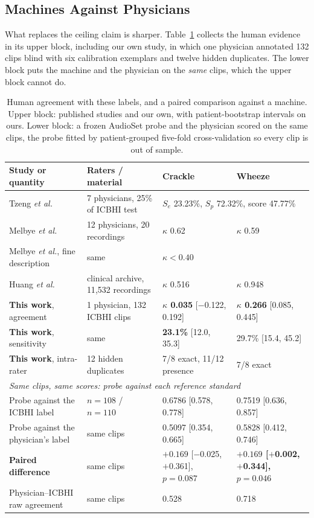\documentclass[journal,onecolumn]{IEEEtran}
\newcommand{\best}[1]{\textbf{#1}}
\begin{document}
\subsection{Machines Against Physicians}
\label{subsec:human}

What replaces the ceiling claim is sharper. Table~\ref{tab:human} collects the human evidence
in its upper block, including our own study, in which one physician annotated 132 clips blind
with six calibration exemplars and twelve hidden duplicates. The lower block puts the machine
and the physician on the \emph{same} clips, which the upper block cannot do.

\begin{table}[!t]
\centering
\caption{Human agreement with these labels, and a paired comparison against a machine. Upper
block: published studies and our own, with patient-bootstrap intervals on ours. Lower block: a
frozen AudioSet probe and the physician scored on the same clips, the probe fitted by
patient-grouped five-fold cross-validation so every clip is out of sample.}
\label{tab:human}
\footnotesize
\begin{tabular}{llll}
\toprule
Study or quantity & Raters / material & Crackle & Wheeze \\
\midrule
Tzeng \emph{et al.}~\cite{tzeng2025jmir} & 7 physicians, 25\% of ICBHI test & \multicolumn{2}{l}{$S_e$ 23.23\%, $S_p$ 72.32\%, score 47.77\%} \\
Melbye \emph{et al.}~\cite{melbye2016kappa} & 12 physicians, 20 recordings & $\kappa$ 0.62 & $\kappa$ 0.59 \\
Melbye \emph{et al.}, fine description & same & \multicolumn{2}{l}{$\kappa < 0.40$} \\
Huang \emph{et al.}~\cite{huang2024crackles} & clinical archive, 11{,}532 recordings & $\kappa$ 0.516 & $\kappa$ 0.948 \\
\addlinespace
\best{This work}, agreement & 1 physician, 132 ICBHI clips & \best{$\kappa$ 0.035} [$-$0.122, 0.192] & \best{$\kappa$ 0.266} [0.085, 0.445] \\
\best{This work}, sensitivity & same & \best{23.1\%} [12.0, 35.3] & 29.7\% [15.4, 45.2] \\
\best{This work}, intra-rater & 12 hidden duplicates & 7/8 exact, 11/12 presence & 7/8 exact \\
\midrule
\multicolumn{4}{l}{\emph{Same clips, same scores: probe against each reference standard}}\\
Probe against the ICBHI label & $n = 108$ / $n = 110$ & 0.6786 [0.578, 0.778] & 0.7519 [0.636, 0.857] \\
Probe against the physician's label & same clips & 0.5097 [0.354, 0.665] & 0.5828 [0.412, 0.746] \\
\best{Paired difference} & same clips & $+0.169$ [$-$0.025, $+$0.361], $p = 0.087$ & \best{$+0.169$ [$+$0.002, $+$0.344], $p = 0.046$} \\
Physician--ICBHI raw agreement & same clips & 0.528 & 0.718 \\
\bottomrule
\end{tabular}


\end{table}
\end{document}
